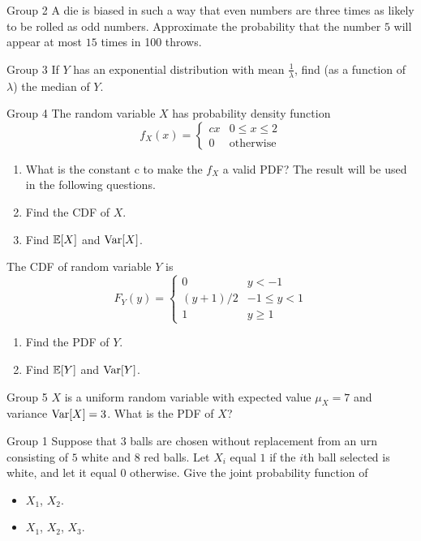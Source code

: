 \documentclass{article}
\begin{document}
\begin{problem}
    {Group 2}
    A die is biased in such a way that even numbers are three times as likely to be rolled as odd numbers. Approximate the probability that the number $5$ will appear at most $15$ times in 100 throws.
\end{problem}

\begin{problem}
    {Group 3}
    If $Y$ has an exponential distribution with mean $\frac{1}{\lambda}$, find (as a function of $\lambda$) the median of $Y$.
\end{problem}

\begin{problem}
    {Group 4}
    The random variable $X$ has probability density function
    \[f_X(x)={
        \begin{cases}
            cx & 0\leq x\leq 2\\
            0  & \text{otherwise}
        \end{cases}
    }\]
    \begin{enumerate}
        \item What is the constant c to make the $f_X$ a valid PDF? The result will be used in the following questions.
        \item Find the CDF of $X$.
        \item Find $\E{X}$ and $\mathop{\mathrm{Var}}\nolimits[X]$.
    \end{enumerate}
    The CDF of random variable $Y$ is
    \[F_Y(y)={
        \begin{cases}
            0 & y<-1\\
            (y+1)/2 & -1\leq y<1\\
            1 & y\geq 1
        \end{cases}
    }\]
    \begin{enumerate}
        \item Find the PDF of $Y$.
        \item Find $\E{Y}$ and $\mathop{\mathrm{Var}}\nolimits[Y]$.
    \end{enumerate}
\end{problem}

\begin{problem}
    {Group 5}
    $X$ is a uniform random variable with expected value $\mu_X = 7$ and variance $\mathop{\mathrm{Var}}\nolimits[X] = 3$. What is the PDF of $X$?
\end{problem}
\begin{problem}
    {Group 1}
    Suppose that $3$ balls are chosen without replacement from an urn consisting of $5$ white and $8$ red balls. Let $X_i$ equal $1$ if the $i$th ball selected is white, and let it equal $0$ otherwise. Give the joint probability function of
    \begin{itemize}
        \item $X_1$, $X_2$.
        \item $X_1$, $X_2$, $X_3$.
    \end{itemize}
\end{problem}
\end{document}
